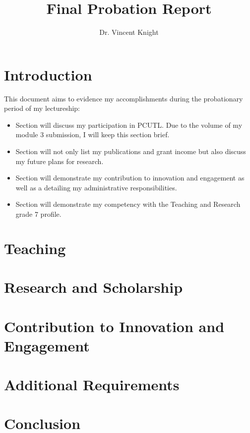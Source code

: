 \documentclass{article}
\title{Final Probation Report}
\author{Dr. Vincent Knight}
\begin{document}
\maketitle

\section{Introduction}\label{sec:introduction}

This document aims to evidence my accomplishments during the probationary period of my lectureship:

\begin{itemize}
    \item Section \label{sec:teaching} will discuss my participation in PCUTL.
    Due to the volume of my module 3 submission, I will keep this section brief.
    \item Section \label{sec:research} will not only list my publications and grant income but also discuss my future plans for research.
    \item Section \label{sec:innocation} will demonstrate my contribution to innovation and engagement as well as a detailing my administrative responsibilities.
    \item Section \label{additional} will demonstrate my competency with the Teaching and Research grade 7 profile.
\end{itemize}

\section{Teaching}\label{sec:teaching}
\section{Research and Scholarship}\label{sec:research}
\section{Contribution to Innovation and Engagement}\label{sec:innovation}
\section{Additional Requirements}\label{sec:additional}
\section{Conclusion}\label{sec:conclusion}
\end{document}
